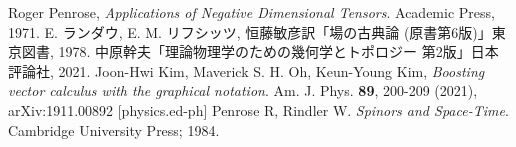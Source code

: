 \documentclass[dvipdfmx]{jsarticle}
\begin{document}
\tableofcontents

\pagebreak



\pagebreak



\pagebreak



\pagebreak



\pagebreak

\appendix



\pagebreak

\begin{thebibliography}{2}
     Roger Penrose, \textit{Applications of Negative Dimensional Tensors}. Academic Press, 1971.
     E. ランダウ, E. M. リフシッツ, 恒藤敏彦訳「場の古典論 (原書第6版)」東京図書, 1978.
     中原幹夫「理論物理学のための幾何学とトポロジー 第2版」日本評論社, 2021.
     Joon-Hwi Kim, Maverick S. H. Oh, Keun-Young Kim, \textit{Boosting vector calculus with the graphical notation}. Am. J. Phys. \textbf{89}, 200-209 (2021), arXiv:1911.00892 [physics.ed-ph]
     Penrose R, Rindler W. \textit{Spinors and Space-Time}. Cambridge University Press; 1984.
\end{thebibliography}
\end{document}
